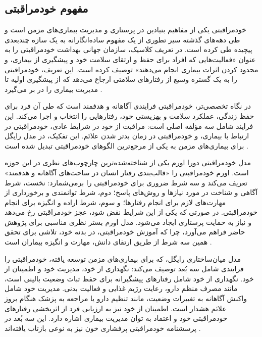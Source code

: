 \subsection{مفهوم خودمراقبتی}
خودمراقبتی یکی از مفاهیم بنیادین در پرستاری و مدیریت بیماری‌های مزمن است و طی دهه‌های گذشته سیر تطوری از یک مفهوم ساده‌انگارانه به یک سازه چندبعدی پیچیده طی کرده است. در تعریف کلاسیک، سازمان جهانی بهداشت خودمراقبتی را به عنوان «فعالیت‌هایی که افراد برای حفظ و ارتقای سلامت خود و پیشگیری از بیماری، و محدود کردن اثرات بیماری انجام می‌دهند» توصیف کرده است. این تعریف، خودمراقبتی را به یک گستره وسیع از رفتارهای سلامتی ارجاع می‌دهد که از پیشگیری اولیه تا مدیریت بیماری را در بر می‌گیرد \cite{who2023hypertension,wilkinson2009selfcare}.
\par
در نگاه تخصصی‌تر، خودمراقبتی فرایندی آگاهانه و هدفمند است که طی آن فرد برای حفظ زندگی، عملکرد سلامت و بهزیستی خود، رفتارهایی را انتخاب و اجرا می‌کند. این فرایند شامل سه مؤلفه اصلی است: مراقبت از خود در شرایط عادی، خودمراقبتی در ارتباط با بیماری، و خودمراقبتی در زمان بدتر شدن علائم. این تفکیک، در مدل رایگل برای بیماری‌های مزمن به یکی از مرجع‌ترین الگوهای خودمراقبتی تبدیل شده است \cite{riegel2012middlerange}.
\par
مدل خودمراقبتی دورا اورم یکی از شناخته‌شده‌ترین چارچوب‌های نظری در این حوزه است. اورم خودمراقبتی را «قالب‌بندی رفتار انسان در ساحت‌های آگاهانه و هدفمند» تعریف می‌کند و سه شرط ضروری برای خودمراقبتی را برمی‌شمارد: نخست، شرط آگاهی و شناخت در مورد نیازها و روش‌های پاسخ؛ دوم، شرط توانمندی و برخورداری از مهارت‌های لازم برای انجام رفتارها؛ و سوم، شرط اراده و انگیزه برای انجام خودمراقبتی. در صورتی که یکی از این شرایط نقض شود، عجز خودمراقبتی رخ می‌دهد و نیاز به حمایت پرستاری ایجاد می‌شود. مدل اورم بستر نظری مناسبی برای پژوهش حاضر فراهم می‌آورد، چرا که آموزش خودمراقبتی، در بدنه خود، تلاشی برای تحقق همین سه شرط از طریق ارتقای دانش، مهارت و انگیزه بیماران است \cite{orem1995nursing}.
\par
مدل میان‌ساختاری رایگل، که برای بیماری‌های مزمن توسعه یافته، خودمراقبتی را فرایندی شامل سه بُعد توصیف می‌کند: نگهداری از خود، مدیریت خود و اطمینان از خود. نگهداری از خود شامل رفتارهای پیشگیرانه برای حفظ ثبات وضعیت بالینی است، مانند مصرف منظم دارو، رعایت رژیم غذایی و فعالیت بدنی. مدیریت خود شامل واکنش آگاهانه به تغییرات وضعیت، مانند تنظیم دارو یا مراجعه به پزشک هنگام بروز علائم هشدار است. اطمینان از خود نیز به ارزیابی فرد از اثربخشی رفتارهای خودمراقبتی خود و اعتماد به توان مدیریت بیماری اشاره دارد. این سه بُعد در پرسشنامه خودمراقبتی پرفشاری خون نیز به نوعی بازتاب یافته‌اند \cite{riegel2012middlerange}.
\par
